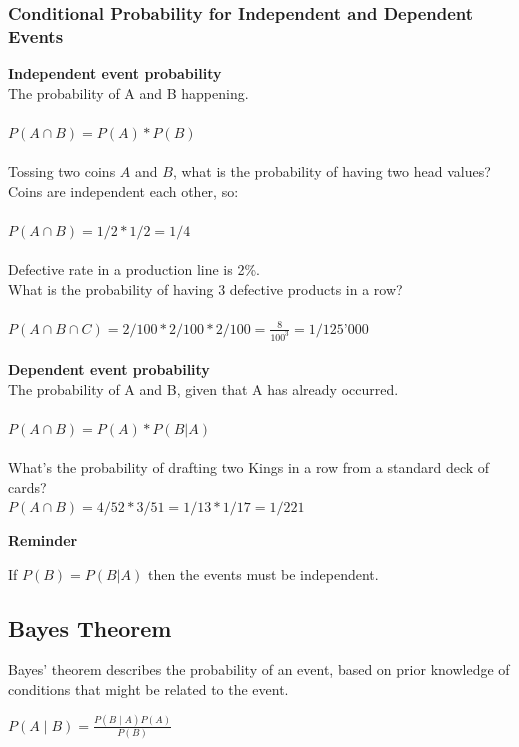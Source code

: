 \documentclass{article}
\begin{document}
\subsubsection{Conditional Probability for Independent and Dependent Events}
\textbf{Independent event probability} \\ 
The probability of A and B happening. \\
\mbox{} \\
$P(A \cap B) = P(A) * P(B)$ \\ 
\mbox{} \\
Tossing two coins $A$ and $B$, what is the probability of having two head values? \\ 
Coins are independent each other, so: \\ 
\mbox{} \\
$P(A \cap B) = 1 / 2 * 1 / 2 = 1 / 4 $ \\ 
\mbox{} \\
Defective rate in a production line is 2\%. \\ 
What is the probability of having 3 defective products in a row?\\
\mbox{} \\
$P(A \cap B \cap  C) = 2 / 100 * 2 / 100 * 2 / 100 = \frac{8}{100^3} = 1 / \text{125'000}$ \\ 
\mbox{} \\
\textbf{Dependent event probability}
\mbox{} \\
The probability of A and B, given that A has already occurred. \\ 
\mbox{} \\
$P(A \cap B) = P(A) * P(B | A)$ \\ 
\mbox{} \\
What’s the probability of drafting two Kings in a row from a standard deck of cards? \\

$P(A \cap B) = 4 / 52 * 3 / 51  = 1 / 13 * 1 / 17 = 1 / 221$

\textbf{Reminder}

If $P(B) = P(B | A)$ then the events must be independent.

\subsection{Bayes Theorem}
Bayes' theorem describes the probability of an event, based on prior knowledge of conditions that might be related to the event. 

$\displaystyle P(A\mid B)={\frac {P(B\mid A)P(A)}{P(B)}}$ \\ 
\end{document}
